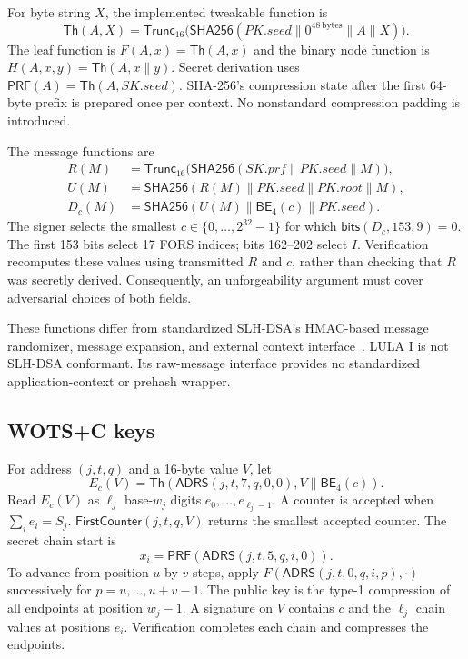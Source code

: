 \documentclass[a4paper,envcountsame,runningheads]{llncs}
\newcommand{\Hh}{\mathsf{SHA256}}
\newcommand{\Tr}{\mathsf{Trunc}_{16}}
\newcommand{\AD}{\mathsf{ADRS}}
\newcommand{\Th}{\mathsf{Th}}
\newcommand{\BE}{\mathsf{BE}_{4}}
\newcommand{\bits}{\mathsf{bits}}
\newcommand{\Ctr}{\mathsf{FirstCounter}}
\begin{document}
For byte string $X$, the implemented tweakable function is
\begin{equation}\label{eq:th}
 \Th(A,X)=\Tr\bigl(\Hh(PK.seed\|0^{48\,\mathrm{bytes}}\|A\|X)\bigr).
\end{equation}
The leaf function is $F(A,x)=\Th(A,x)$ and the binary node function is $H(A,x,y)=\Th(A,x\|y)$. Secret derivation uses $\mathsf{PRF}(A)=\Th(A,SK.seed)$. SHA-256's compression state after the first 64-byte prefix is prepared once per context. No nonstandard compression padding is introduced.

The message functions are
\begin{align}\label{eq:message}
 R(M)&=\Tr\bigl(\Hh(SK.prf\|PK.seed\|M)\bigr),\nonumber\\
 U(M)&=\Hh(R(M)\|PK.seed\|PK.root\|M),\\
 D_c(M)&=\Hh(U(M)\|\BE(c)\|PK.seed).\nonumber
\end{align}
The signer selects the smallest $c\in\{0,\ldots,2^{32}-1\}$ for which $\bits(D_c,153,9)=0$. The first 153 bits select 17 FORS indices; bits 162--202 select $I$. Verification recomputes these values using transmitted $R$ and $c$, rather than checking that $R$ was secretly derived. Consequently, an unforgeability argument must cover adversarial choices of both fields.

These functions differ from standardized SLH-DSA's HMAC-based message randomizer, message expansion, and external context interface~\cite[Sections~10.2, 10.3, and 11.2]{fips205}. LULA I is not SLH-DSA conformant. Its raw-message interface provides no standardized application-context or prehash wrapper.

\subsection{WOTS+C keys}
For address $(j,t,q)$ and a 16-byte value $V$, let
\[
 E_c(V)=\Th(\AD(j,t,7,q,0,0),V\|\BE(c)).
\]
Read $E_c(V)$ as $\ell_j$ base-$w_j$ digits $e_0,\ldots,e_{\ell_j-1}$. A counter is accepted when $\sum_i e_i=S_j$. $\Ctr(j,t,q,V)$ returns the smallest accepted counter. The secret chain start is
\[
 x_i=\mathsf{PRF}(\AD(j,t,5,q,i,0)).
\]
To advance from position $u$ by $v$ steps, apply $F(\AD(j,t,0,q,i,p),\cdot)$ successively for $p=u,\ldots,u+v-1$. The public key is the type-1 compression of all endpoints at position $w_j-1$. A signature on $V$ contains $c$ and the $\ell_j$ chain values at positions $e_i$. Verification completes each chain and compresses the endpoints.
\end{document}
